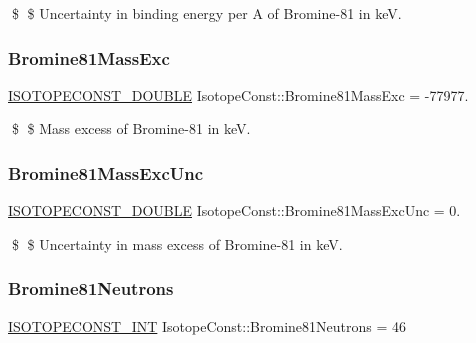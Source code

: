 \$ \$ Uncertainty in binding energy per A of Bromine-\/81 in keV. \mbox{\label{group___isotope_const-_bromine-_br81_ga7bf0d801a96d83a4eae94b1d606efcdf}} 
\subsubsection{\texorpdfstring{Bromine81\+Mass\+Exc}{Bromine81MassExc}}
{\footnotesize\ttfamily \mbox{\hyperlink{group___isotope_const-_macros_ga8f45a7272ce02c0b4c65c44636ed719a}{I\+S\+O\+T\+O\+P\+E\+C\+O\+N\+S\+T\+\_\+\+D\+O\+U\+B\+LE}} Isotope\+Const\+::\+Bromine81\+Mass\+Exc = -\/77977.}

\$ \$ Mass excess of Bromine-\/81 in keV. \mbox{\label{group___isotope_const-_bromine-_br81_ga7d5aba856014d4665cd26deee46ffc27}} 
\subsubsection{\texorpdfstring{Bromine81\+Mass\+Exc\+Unc}{Bromine81MassExcUnc}}
{\footnotesize\ttfamily \mbox{\hyperlink{group___isotope_const-_macros_ga8f45a7272ce02c0b4c65c44636ed719a}{I\+S\+O\+T\+O\+P\+E\+C\+O\+N\+S\+T\+\_\+\+D\+O\+U\+B\+LE}} Isotope\+Const\+::\+Bromine81\+Mass\+Exc\+Unc = 0.}

\$ \$ Uncertainty in mass excess of Bromine-\/81 in keV. \mbox{\label{group___isotope_const-_bromine-_br81_ga0e133759293b796b1405b74a868b1617}} 
\subsubsection{\texorpdfstring{Bromine81\+Neutrons}{Bromine81Neutrons}}
{\footnotesize\ttfamily \mbox{\hyperlink{group___isotope_const-_macros_ga5f18360b3e99483a35c32d789e62621c}{I\+S\+O\+T\+O\+P\+E\+C\+O\+N\+S\+T\+\_\+\+I\+NT}} Isotope\+Const\+::\+Bromine81\+Neutrons = 46}

